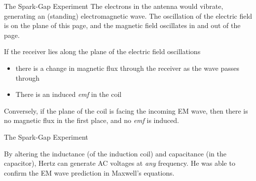 \documentclass[12pt,aspectratio=169]{beamer}
\begin{document}
\begin{frame}{The Spark-Gap Experiment}
  The electrons in the antenna would vibrate, generating an (standing)
  electromagnetic wave. The oscillation of the electric field is on the plane
  of this page, and the magnetic field oscillates in and out of the page.
  \begin{center}
  \end{center}
  If the receiver lies along the plane of the electric field oscillations
  \begin{itemize}
  \item there is a change in magnetic flux through the receiver as the
    wave passes through
  \item There is an induced \emph{emf} in the coil
  \end{itemize}
  Conversely, if the plane of the coil is facing the incoming EM wave, then
  there is no magnetic flux in the first place, and no \emph{emf} is induced.
\end{frame}



\begin{frame}{The Spark-Gap Experiment}
  \begin{center}
  \end{center}
  By altering the inductance (of the induction coil) and capacitance (in the
  capacitor), Hertz can generate AC voltages at \emph{any} frequency. He was
  able to confirm the EM wave prediction in Maxwell's equations.
\end{frame}
\end{document}

